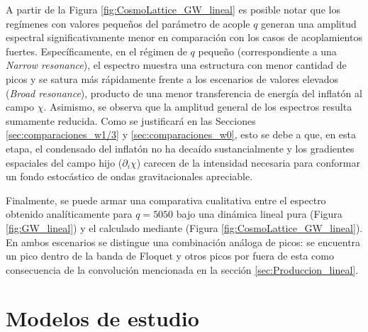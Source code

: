 \vspace{3cm}

A partir de la Figura \ref{fig:CosmoLattice_GW_lineal} es posible notar que los regímenes con valores pequeños del parámetro de acople $q$ generan una amplitud espectral significativamente menor en comparación con los casos de acoplamientos fuertes. Específicamente, en el régimen de $q$ pequeño (correspondiente a una \textit{Narrow resonance}), el espectro muestra una estructura con menor cantidad de picos y se satura más rápidamente frente a los escenarios de valores elevados (\textit{Broad resonance}), producto de una menor transferencia de energía del inflatón al campo $\chi$. Asimismo, se observa que la amplitud general de los espectros resulta sumamente reducida. Como se justificará en las Secciones \ref{sec:comparaciones_w1/3} y \ref{sec:comparaciones_w0}, esto se debe a que, en esta etapa, el condensado del inflatón no ha decaído sustancialmente y los gradientes espaciales del campo hijo ($\partial_i \chi$) carecen de la intensidad necesaria para conformar un fondo estocástico de ondas gravitacionales apreciable.

Finalmente, se puede armar una comparativa cualitativa entre el espectro obtenido analíticamente para $q = 5050$ bajo una dinámica lineal pura (Figura \ref{fig:GW_lineal}) y el calculado mediante \CosmoLattice (Figura \ref{fig:CosmoLattice_GW_lineal}). En ambos escenarios se distingue una combinación análoga de picos: se encuentra un pico dentro de la banda de Floquet y otros picos por fuera de esta como consecuencia de la convolución mencionada en la sección \ref{sec:Produccion_lineal}.

\section{Modelos de estudio}

